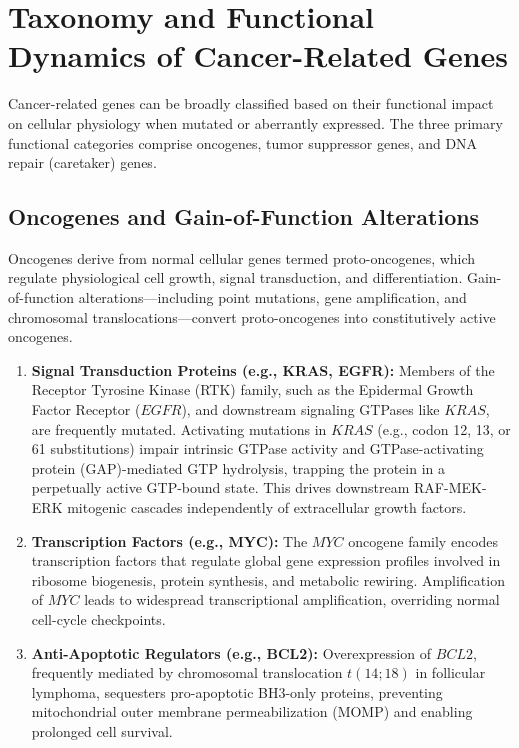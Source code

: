 \documentclass{article}
\begin{document}
\section{Taxonomy and Functional Dynamics of Cancer-Related Genes}

Cancer-related genes can be broadly classified based on their functional impact on cellular physiology when mutated or aberrantly expressed. The three primary functional categories comprise oncogenes, tumor suppressor genes, and DNA repair (caretaker) genes.

\subsection{Oncogenes and Gain-of-Function Alterations}

Oncogenes derive from normal cellular genes termed proto-oncogenes, which regulate physiological cell growth, signal transduction, and differentiation. Gain-of-function alterations—including point mutations, gene amplification, and chromosomal translocations—convert proto-oncogenes into constitutively active oncogenes.

\begin{enumerate}
    \item \textbf{Signal Transduction Proteins (e.g., KRAS, EGFR):} 
    Members of the Receptor Tyrosine Kinase (RTK) family, such as the Epidermal Growth Factor Receptor ($EGFR$), and downstream signaling GTPases like $KRAS$, are frequently mutated. Activating mutations in $KRAS$ (e.g., codon 12, 13, or 61 substitutions) impair intrinsic GTPase activity and GTPase-activating protein (GAP)-mediated GTP hydrolysis, trapping the protein in a perpetually active GTP-bound state. This drives downstream RAF-MEK-ERK mitogenic cascades independently of extracellular growth factors.
    
    \item \textbf{Transcription Factors (e.g., MYC):} 
    The $MYC$ oncogene family encodes transcription factors that regulate global gene expression profiles involved in ribosome biogenesis, protein synthesis, and metabolic rewiring. Amplification of $MYC$ leads to widespread transcriptional amplification, overriding normal cell-cycle checkpoints.
    
    \item \textbf{Anti-Apoptotic Regulators (e.g., BCL2):} 
    Overexpression of $BCL2$, frequently mediated by chromosomal translocation $t(14;18)$ in follicular lymphoma, sequesters pro-apoptotic BH3-only proteins, preventing mitochondrial outer membrane permeabilization (MOMP) and enabling prolonged cell survival.
\end{enumerate}
\end{document}
